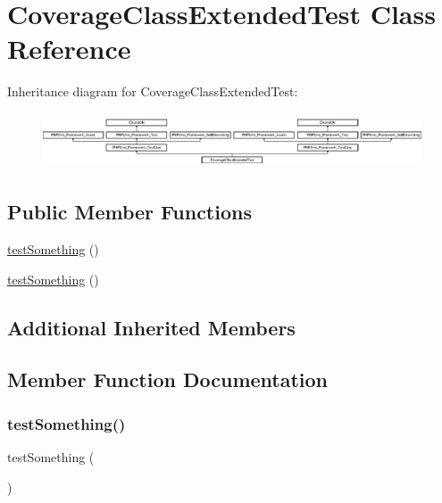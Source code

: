 \hypertarget{class_coverage_class_extended_test}{}\section{Coverage\+Class\+Extended\+Test Class Reference}
\label{class_coverage_class_extended_test}
Inheritance diagram for Coverage\+Class\+Extended\+Test\+:\begin{figure}[H]
\begin{center}
\leavevmode
\includegraphics[height=1.651917cm]{class_coverage_class_extended_test}
\end{center}
\end{figure}
\subsection*{Public Member Functions}
\begin{DoxyCompactItemize}
\item 
\mbox{\hyperlink{class_coverage_class_extended_test_a0fc4e17369bc9607ebdd850d9eda8167}{test\+Something}} ()
\item 
\mbox{\hyperlink{class_coverage_class_extended_test_a0fc4e17369bc9607ebdd850d9eda8167}{test\+Something}} ()
\end{DoxyCompactItemize}
\subsection*{Additional Inherited Members}


\subsection{Member Function Documentation}
\mbox{\label{class_coverage_class_extended_test_a0fc4e17369bc9607ebdd850d9eda8167}} 
\subsubsection{\texorpdfstring{test\+Something()}{testSomething()}\hspace{0.1cm}{\footnotesize\ttfamily [1/2]}}
{\footnotesize\ttfamily test\+Something (\begin{DoxyParamCaption}{ }\end{DoxyParamCaption})}

